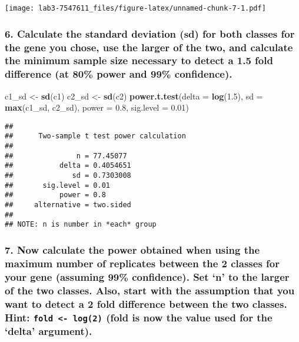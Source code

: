 \documentclass[]{article}
\newenvironment{Shaded}{\begin{snugshade}}{\end{snugshade}}
\newcommand{\KeywordTok}[1]{\textcolor[rgb]{0.13,0.29,0.53}{\textbf{{#1}}}}
\newcommand{\DataTypeTok}[1]{\textcolor[rgb]{0.13,0.29,0.53}{{#1}}}
\newcommand{\FloatTok}[1]{\textcolor[rgb]{0.00,0.00,0.81}{{#1}}}
\newcommand{\StringTok}[1]{\textcolor[rgb]{0.31,0.60,0.02}{{#1}}}
\newcommand{\NormalTok}[1]{{#1}}
\begin{document}
\texttt{[image: lab3-7547611\_files/figure-latex/unnamed-chunk-7-1.pdf]}
\newpage

\subsubsection{6. Calculate the standard deviation (sd) for both classes
for the gene you chose, use the larger of the two, and calculate the
minimum sample size necessary to detect a 1.5 fold difference (at 80\%
power and 99\%
confidence).}\label{calculate-the-standard-deviation-sd-for-both-classes-for-the-gene-you-chose-use-the-larger-of-the-two-and-calculate-the-minimum-sample-size-necessary-to-detect-a-1.5-fold-difference-at-80-power-and-99-confidence.}

\begin{Shaded}
\begin{Highlighting}[]
\NormalTok{c1_sd <-}\StringTok{ }\KeywordTok{sd}\NormalTok{(c1)}
\NormalTok{c2_sd <-}\StringTok{ }\KeywordTok{sd}\NormalTok{(c2)}
\KeywordTok{power.t.test}\NormalTok{(}\DataTypeTok{delta =} \KeywordTok{log}\NormalTok{(}\FloatTok{1.5}\NormalTok{),}
             \DataTypeTok{sd =} \KeywordTok{max}\NormalTok{(c1_sd, c2_sd),}
             \DataTypeTok{power =} \FloatTok{0.8}\NormalTok{,}
             \DataTypeTok{sig.level =} \FloatTok{0.01}\NormalTok{)}
\end{Highlighting}
\end{Shaded}

\begin{verbatim}
## 
##      Two-sample t test power calculation 
## 
##               n = 77.45077
##           delta = 0.4054651
##              sd = 0.7303008
##       sig.level = 0.01
##           power = 0.8
##     alternative = two.sided
## 
## NOTE: n is number in *each* group
\end{verbatim}

\subsubsection{\texorpdfstring{7. Now calculate the power obtained when
using the maximum number of replicates between the 2 classes for your
gene (assuming 99\% confidence). Set `n' to the larger of the two
classes. Also, start with the assumption that you want to detect a 2
fold difference between the two classes. Hint:
\texttt{fold\ \textless{}-\ log(2)} (fold is now the value used for the
`delta'
argument).}{7. Now calculate the power obtained when using the maximum number of replicates between the 2 classes for your gene (assuming 99\% confidence). Set n to the larger of the two classes. Also, start with the assumption that you want to detect a 2 fold difference between the two classes. Hint: fold \textless{}- log(2) (fold is now the value used for the delta argument).}}\label{now-calculate-the-power-obtained-when-using-the-maximum-number-of-replicates-between-the-2-classes-for-your-gene-assuming-99-confidence.-set-n-to-the-larger-of-the-two-classes.-also-start-with-the-assumption-that-you-want-to-detect-a-2-fold-difference-between-the-two-classes.-hint-fold---log2-fold-is-now-the-value-used-for-the-delta-argument.}
\end{document}
